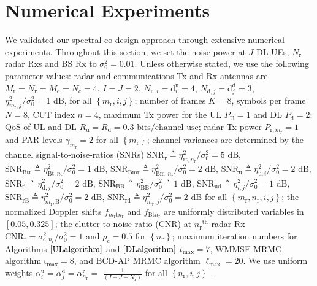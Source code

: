 \documentclass[10pt,journal]{IEEEtran}
\newcommand{\paren}[1]{\left({#1}\right)}
\newcommand{\bracket}[1]{{\left [{#1}\right ]}}
\newcommand{\braces}[1]{{\left\{ {#1}\right\}}}
\newcommand{\ith}[1]    {{#1}^{\underline{\text{th}}}}
\newcommand{\rr}{_\mathrm{r}}
\newcommand{\cc}{_\mathrm{c}}
\newcommand{\sfrac}[2]{#1/#2}
\theoremstyle{definition}
\begin{document}
		\section{Numerical Experiments}
		\label{sec:numerical}
		We validated our spectral co-design approach through extensive numerical experiments. %
		Throughout this section, we set the noise power at $\mathit{J}$ DL UEs, $\mathit{N}\rr$ radar Rxs and BS Rx to $\sigma^2_0=0.01$. Unless otherwise stated, we use the following parameter values: radar and communications Tx and Rx antennas are $\mathit{M}\rr=\mathit{N}\rr=\mathit{M}\cc=\mathit{N}\cc=4$, $\mathit{I}=\mathit{J}=2$, $\mathit{N}_{\mathrm{u},i}=\mathrm{d}^{\textrm{u}}_i=4$, $\mathit{N}_{\mathrm{d},j}=\mathrm{d}^{\textrm{d}}_j=3$,  $\sfrac{\eta^2_{m\rr,j}}{\sigma^2_0}=1\textrm{ dB}$, for all $\braces{m\rr,i,j}$; number of frames $\mathit{K}=8$, symbols per frame $\mathit{N}=8$, CUT index $n=4$, maximum Tx power for the UL $\mathit{P}_\textrm{U}=1$ and DL $\mathit{P}_\textrm{d}=2$; QoS of UL and DL $\mathit{R}_{\textrm{u}}=\mathit{R}_{\textrm{d}}=0.3\textrm{ bits/channel use}$; radar Tx power $\mathit{P}_{\textrm{r},m\rr}=1$ and PAR levels $\gamma_{m\rr}=2$ for all $\braces{m\rr}$; channel variances are determined by the channel signal-to-noise-ratios (SNRs) $\mathrm{SNR}_{\textrm{r}}\triangleq\sfrac{\eta^2_{\mathrm{rt},n\rr}}{\sigma^2_{0}}=5\textrm{ dB}$, $\mathrm{SNR}_{\textrm{Btr}}\triangleq\sfrac{\eta^2_{\textrm{Bt},n\rr}}{\sigma^2_{0}}=1 \textrm{ dB}$, $\mathrm{SNR}_{\textrm{Bmr}}\triangleq\sfrac{\eta^2_{\textrm{Bm},n\rr}}{\sigma^2_{0}}=2 \textrm{ dB}$, $\mathrm{SNR}_{\textrm{u}}\triangleq\sfrac{\eta^2_{\textrm{u},i}}{\sigma^2_{0}}=2\textrm{ dB}$, $\mathrm{SNR}_{\textrm{d}}\triangleq\sfrac{\eta^2_{\textrm{d},j}}{\sigma^2_0}=2\textrm{ dB}$, $\mathrm{SNR}_{\textrm{BB}}\triangleq\sfrac{\eta^2_{\textrm{BB}}}{\sigma^2_{0}}\triangleq1\textrm{ dB}$, $\mathrm{SNR}_{\textrm{ud}}\triangleq\sfrac{\eta^2_{i,j}}{\sigma^2_{0}}=1\textrm{ dB}$, $\mathrm{SNR}_{\textrm{rB}}\triangleq\sfrac{\eta^2_{m\rr,\textrm{B}}}{\sigma^2_0}=2\textrm{ dB}$, $\mathrm{SNR}_{\textrm{rd}}\triangleq\sfrac{\eta^2_{m\rr,j}}{\sigma^2_0}=2\textrm{ dB}$ for all $\braces{m\rr,n\rr,i,j}$; the normalized Doppler shifts $f_{m\rr\textrm{t}n\rr}$ and $f_{\textrm{Bt}n\rr}$ are uniformly distributed variables in $\bracket{0.05,0.325}$; the clutter-to-noise-ratio (CNR) at $\ith{n\rr}$ radar Rx $\mathrm{CNR}_{\textrm{r}}=\sfrac{\sigma^2_{\text{c},n\rr}}{\sigma^2_0}=1$ and $\rho_{\textrm{c}}=0.5$ for $\braces{n\rr}$; maximum iteration numbers for Algorithms $\ref{ULalgorithm}$ and $\ref{DLalgorithm}$ $t_{\textrm{max}}=7$, WMMSE-MRMC algorithm $\mathrm{\iota}_{\textrm{max}}=8$, and BCD-AP MRMC algorithm $\mathrm{\ell}_{\textrm{max}}=20$. We use uniform weights  $\alpha^\textrm{u}_{i}= \alpha^{\textrm{d}}_{j}=\alpha^\textrm{r}_{n\rr}=$ $\frac{1}{\paren{\mathit{I}+\mathit{J}+\mathit{N}\rr}}$ for all $\braces{n\rr,i,j}$ .
\end{document}
